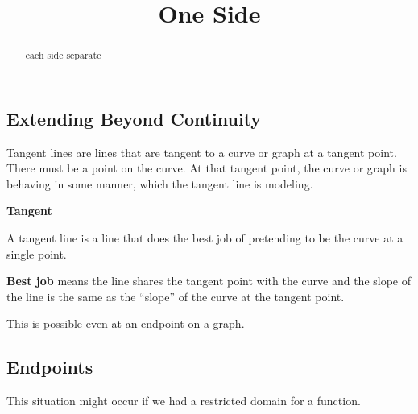 \documentclass{ximera}
\title{One Side}
\begin{document}
\begin{abstract}
each side separate
\end{abstract}
\maketitle



\subsection*{Extending Beyond Continuity} 


 
 

Tangent lines are lines that are tangent to a curve or graph at a tangent point. There must be a point on the curve. At that tangent point, the curve or graph is behaving in some manner, which the tangent line is modeling.  

\begin{idea} \textbf{\textcolor{blue!55!black}{Tangent}}

A tangent line is a line that does the best job of pretending to be the curve at a single point.
\end{idea}
\textbf{Best job} means the line shares the tangent point with the curve and the slope of the line is the same as the ``slope'' of the curve at the tangent point. 





This is possible even at an endpoint on a graph.





\subsection*{Endpoints}



This situation might occur if we had a restricted domain for a function.
\end{document}
